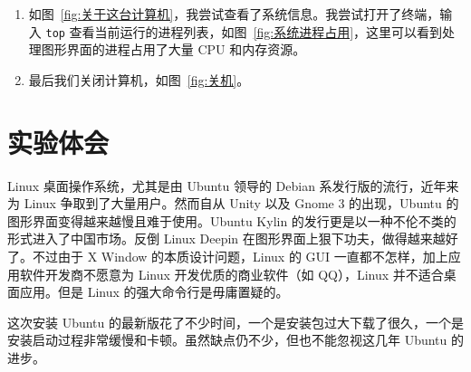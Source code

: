 \documentclass[cs4size,a4paper,nofonts]{ctexart}
\begin{document}
\begin{enumerate}
\item 如图~\ref{fig:关于这台计算机}，我尝试查看了系统信息。我尝试打开了终端，输入 \verb|top| 查看当前运行的进程列表，如图~\ref{fig:系统进程占用}，这里可以看到处理图形界面的进程占用了大量 CPU 和内存资源。

\begin{figure}[htp]
\end{figure}

\item 最后我们关闭计算机，如图~\ref{fig:关机}。

\begin{figure}[htp]
\end{figure}

\end{enumerate}

\section*{实验体会}

Linux 桌面操作系统，尤其是由 Ubuntu 领导的 Debian 系发行版的流行，近年来为 Linux 争取到了大量用户。然而自从 Unity 以及 Gnome 3 的出现，Ubuntu 的图形界面变得越来越慢且难于使用。Ubuntu Kylin 的发行更是以一种不伦不类的形式进入了中国市场。反倒 Linux Deepin 在图形界面上狠下功夫，做得越来越好了。不过由于 X Window 的本质设计问题，Linux 的 GUI 一直都不怎样，加上应用软件开发商不愿意为 Linux 开发优质的商业软件（如 QQ），Linux 并不适合桌面应用。但是 Linux 的强大命令行是毋庸置疑的。

这次安装 Ubuntu 的最新版花了不少时间，一个是安装包过大下载了很久，一个是安装启动过程非常缓慢和卡顿。虽然缺点仍不少，但也不能忽视这几年 Ubuntu 的进步。
\end{document}
